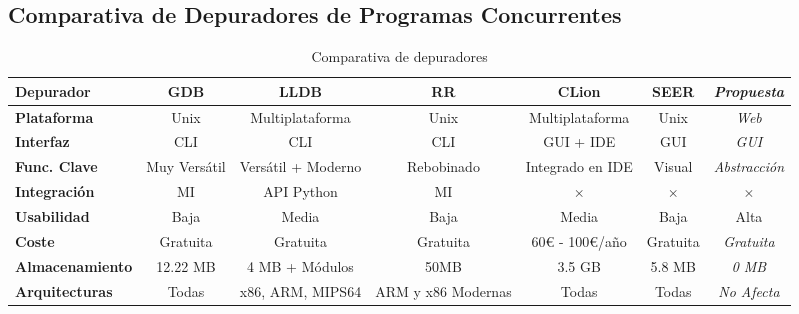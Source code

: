 \subsection{Comparativa de Depuradores de Programas Concurrentes}{\label{subsec:comparativa-depuradores-concurrentes}}

\begin{table}[htb]
    \begin{adjustbox}{max width=\textwidth}  %
        \begin{threeparttable}[htb]
            \begin{tabular}{lcccccc}
                \toprule
                \textbf{Depurador} & GDB & LLDB & RR & CLion & SEER & \textit{Propuesta} \\ \hline
                \textbf{Plataforma}      & Unix     & Multiplataforma & Unix     & Multiplataforma & Unix       & \textit{Web}        \\
                \textbf{Interfaz}        & CLI      & CLI             & CLI      & GUI + IDE       & GUI        & \textit{GUI}        \\
                \textbf{Func. Clave}     & Muy Versátil     & Versátil + Moderno           & Rebobinado     & Integrado en IDE           & Visual      & \textit{Abstracción} \\
                \textbf{Integración}     & MI    & API Python            & MI    & $\times$            & $\times$       & $\times$ \\              
                \textbf{Usabilidad}      & Baja     & Media      & Baja     & Media      & Baja      & Alta       \\
                \textbf{Coste}           & Gratuita & Gratuita        & Gratuita & 60€ - 100€/año   & Gratuita   & \textit{Gratuita}   \\
                \textbf{Almacenamiento}  & 12.22 MB & 4 MB + Módulos  & 50MB     & 3.5 GB          & 5.8 MB     & \textit{0 MB}       \\
                \textbf{Arquitecturas}   & Todas & x86, ARM, MIPS64  & ARM y x86 Modernas     & Todas          & Todas     & \textit{No Afecta}       \\ \bottomrule
            \end{tabular}
        \end{threeparttable}
    \end{adjustbox}
    \caption{Comparativa de depuradores}
    \label{tab:comparativa-depuradores}
\end{table}

